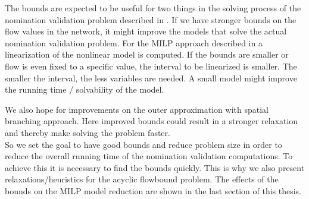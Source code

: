 The bounds are expected to be useful for two things in the solving process of the nomination validation problem 
described in \cite{PfetschFuegenschuhGeissleretal.2012}. If we have stronger bounds on the flow values in the network, 
it might improve the models that solve the actual nomination validation problem. 
For the MILP approach described in \cite{PfetschFuegenschuhGeissleretal.2012} a linearization of the 
nonlinear model is computed. If the bounds are smaller or flow is even fixed to a specific value, the interval to be 
linearized is smaller. The smaller the interval, the less variables are needed. A small model might improve the running 
time / solvability of the model.

We also hope for improvements on the outer approximation with spatial branching approach. Here improved bounds could 
result in a stronger relaxation and thereby make solving the problem faster. \\

So we set the goal to have good bounds and reduce problem size in order to reduce the overall running time of the 
nomination validation computations. To achieve this it is necessary to find the bounds quickly. This is why we also 
present relaxations/heuristics for the acyclic flowbound problem. The effects of the bounds on the MILP model reduction 
are shown in the last section of this thesis.




